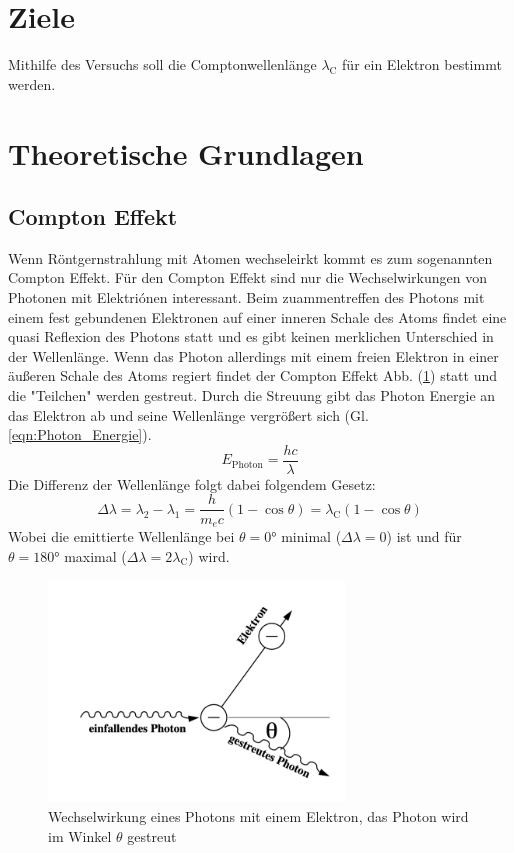 \section{Ziele}
Mithilfe des Versuchs soll die Comptonwellenlänge $\lambda_{\text{C}}$ für ein Elektron bestimmt werden.

\section{Theoretische Grundlagen}
\label{sec:theorie}

\subsection{Compton Effekt}
Wenn Röntgernstrahlung mit Atomen wechseleirkt kommt es zum sogenannten Compton Effekt.
Für den Compton Effekt sind nur die Wechselwirkungen von Photonen mit Elektriónen interessant.
Beim zuammentreffen des Photons mit einem fest gebundenen Elektronen auf einer inneren Schale des Atoms findet eine quasi Reflexion des Photons statt und es gibt keinen merklichen Unterschied in der Wellenlänge.
Wenn das Photon allerdings mit einem freien Elektron in einer äußeren Schale des Atoms regiert findet der Compton Effekt Abb. (\ref{fig:Compton_Effekt}) statt und die "Teilchen" werden gestreut.
Durch die Streuung gibt das Photon Energie an das Elektron ab und seine Wellenlänge vergrößert sich (Gl. \ref{eqn:Photon_Energie}).
\begin{equation}
    E_{\text{Photon}} = \frac{hc}{\lambda} \label{eqn:Photon_Energie}
\end{equation}
Die Differenz der Wellenlänge folgt dabei folgendem Gesetz:
\begin{equation}
    \Delta \lambda = \lambda_2 - \lambda_1
                    = \frac{h}{m_e c}\left( 1- \cos \theta \right) 
                    = \lambda_{\text{C}} \left( 1- \cos \theta \right) \label{eqn:Compton_Gesetz} 
\end{equation}
Wobei die emittierte Wellenlänge bei $\theta = 0°$ minimal ($\Delta\lambda = 0$) ist und für $\theta = 180°$ maximal ($\Delta\lambda = 2\lambda_{\text{C}}$) wird.
\begin{figure}
    \centering
    \includegraphics[width=0.7\textwidth]{bilder/Compton_Effekt.png}
    \caption{Wechselwirkung eines Photons mit einem Elektron, das Photon wird im Winkel $\theta$ gestreut}
    \label{fig:Compton_Effekt}
\end{figure}


